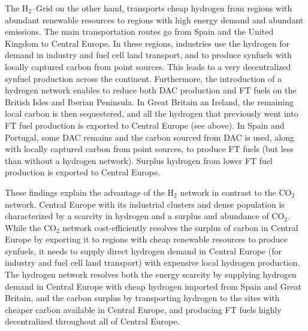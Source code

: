 \documentclass[twocolumn]{article}
\newcommand{\carbon}{CO$_2$}
\newcommand{\hydrogen}{H$_2$}
\newcommand{\hydrogengrid}{\hydrogen{}--Grid}
\begin{document}
The \hydrogengrid{} on the other hand, transports cheap hydrogen from regions with abundant renewable resources to regions with high energy demand and abundant emissions. The main transportation routes go from Spain and the United Kingdom to Central Europe. In these regions, industries use the hydrogen for demand in industry and fuel cell land transport, and to produce synfuels with locally captured carbon from point sources. This leads to a very decentralized synfuel production across the continent. Furthermore, the introduction of a hydrogen network enables to reduce both DAC production and FT fuels on the British Isles and Iberian Peninsula. In Great Britain an Ireland, the remaining local carbon is then sequestered, and all the hydrogen that previously went into FT fuel production is exported to Central Europe (see above). In Spain and Portugal, some DAC remains and the carbon sourced from DAC is used, along with locally captured carbon from point sources, to produce FT fuels (but less than without a hydrogen network). Surplus hydrogen from lower FT fuel production is exported to Central Europe.


These findings explain the advantage of the \hydrogen{} network in contrast to the \carbon{} network. Central Europe with its industrial clusters and dense population is characterized by a scarcity in hydrogen and a surplus and abundance of \carbon. While the \carbon{} network cost-efficiently resolves the surplus of carbon in Central Europe by exporting it to regions with cheap renewable resources to produce synfuels, it needs to supply direct hydrogen demand in Central Europe (for industry and fuel cell land transport) with expensive local hydrogen production. The hydrogen network resolves both the energy scarcity by supplying hydrogen demand in Central Europe with cheap hydrogen imported from Spain and Great Britain, and the carbon surplus by transporting hydrogen to the sites with cheaper carbon available in Central Europe, and producing FT fuels highly decentralized throughout all of Central Europe.
\end{document}
